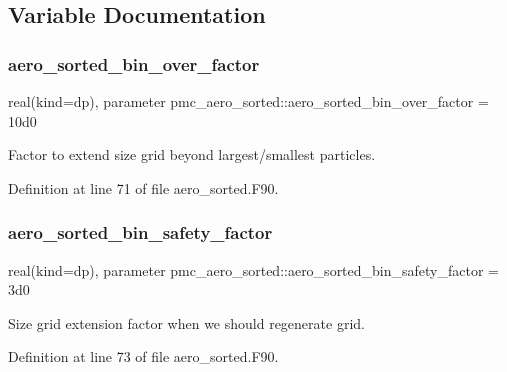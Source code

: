 \subsection{Variable Documentation}
\mbox{\label{namespacepmc__aero__sorted_a8d4f2e6bc86816a9514588cfaf6d26b5}} 
\subsubsection{\texorpdfstring{aero\+\_\+sorted\+\_\+bin\+\_\+over\+\_\+factor}{aero\_sorted\_bin\_over\_factor}}
{\footnotesize\ttfamily real(kind=dp), parameter pmc\+\_\+aero\+\_\+sorted\+::aero\+\_\+sorted\+\_\+bin\+\_\+over\+\_\+factor = 10d0}



Factor to extend size grid beyond largest/smallest particles. 



Definition at line 71 of file aero\+\_\+sorted.\+F90.

\mbox{\label{namespacepmc__aero__sorted_add014bc362ca68811406a3fd86b27706}} 
\subsubsection{\texorpdfstring{aero\+\_\+sorted\+\_\+bin\+\_\+safety\+\_\+factor}{aero\_sorted\_bin\_safety\_factor}}
{\footnotesize\ttfamily real(kind=dp), parameter pmc\+\_\+aero\+\_\+sorted\+::aero\+\_\+sorted\+\_\+bin\+\_\+safety\+\_\+factor = 3d0}



Size grid extension factor when we should regenerate grid. 



Definition at line 73 of file aero\+\_\+sorted.\+F90.

